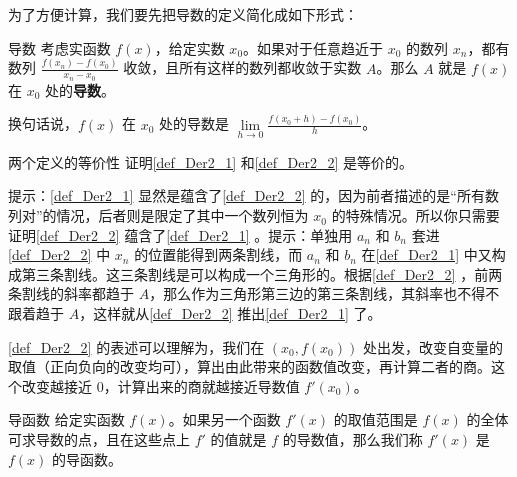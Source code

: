 



为了方便计算，我们要先把导数的定义简化成如下形式：

\begin{definition}{导数}\label{def_Der2_2}
考虑实函数 $f(x)$，给定实数 $x_0$。如果对于任意趋近于 $x_0$ 的数列 $x_n$，都有数列 $\frac{f(x_n)-f(x_0)}{x_n-x_0}$ 收敛，且所有这样的数列都收敛于实数 $A$。那么 $A$ 就是 $f(x)$ 在 $x_0$ 处的\textbf{导数}。

换句话说，$f(x)$ 在 $x_0$ 处的导数是 $\lim\limits_{h\to 0}\frac{f(x_0+h)-f(x_0)}{h}$。
\end{definition}

\begin{exercise}{两个定义的等价性}
证明\autoref{def_Der2_1} 和\autoref{def_Der2_2} 是等价的。

提示：\autoref{def_Der2_1} 显然是蕴含了\autoref{def_Der2_2} 的，因为前者描述的是“所有数列对”的情况，后者则是限定了其中一个数列恒为 $x_0$ 的特殊情况。所以你只需要证明\autoref{def_Der2_2} 蕴含了\autoref{def_Der2_1} 。提示：单独用 $a_n$ 和 $b_n$ 套进\autoref{def_Der2_2} 中 $x_n$ 的位置能得到两条割线，而 $a_n$ 和 $b_n$ 在\autoref{def_Der2_1} 中又构成第三条割线。这三条割线是可以构成一个三角形的。根据\autoref{def_Der2_2} ，前两条割线的斜率都趋于 $A$，那么作为三角形第三边的第三条割线，其斜率也不得不跟着趋于 $A$，这样就从\autoref{def_Der2_2} 推出\autoref{def_Der2_1} 了。
\end{exercise}


\autoref{def_Der2_2} 的表述可以理解为，我们在 $(x_0, f(x_0))$ 处出发，改变自变量的取值（正向负向的改变均可），算出由此带来的函数值改变，再计算二者的商。这个改变越接近 $0$，计算出来的商就越接近导数值 $f'(x_0)$。

\begin{definition}{导函数}
给定实函数 $f(x)$。如果另一个函数 $f'(x)$ 的取值范围是 $f(x)$ 的全体可求导数的点，且在这些点上 $f'$ 的值就是 $f$ 的导数值，那么我们称 $f'(x)$ 是 $f(x)$ 的导函数。
\end{definition}

